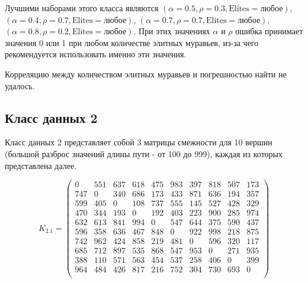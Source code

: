Лучшими наборами этого класса являются $(\alpha = 0.5, \rho = 0.3, \text{Elites} = \text{любое})$, $(\alpha = 0.4, \rho = 0.7, \text{Elites} = \text{любое})$, $(\alpha = 0.7, \rho = 0.7, \text{Elites} = \text{любое})$, $(\alpha = 0.8, \rho = 0.2, \text{Elites} = \text{любое})$.
При этих значениях $\alpha$ и $\rho$ ошибка принимает значения 0 или 1 при любом количестве элитных муравьев, из-за чего рекомендуется использовать именно эти значения.

Корреляцию между количеством элитных муравьев и погрешностью найти не удалось.

\subsection{Класс данных 2}\label{par:class2}

Класс данных 2 представляет собой 3 матрицы смежности для 10 вершин (большой разброс значений длины пути - от 100 до 999), каждая из которых представлена далее.

\begin{equation}
	\label{eq:kd2.1}
	K_{2.1} = \begin{pmatrix}
        0 & 551 & 637 & 618 & 475 & 983 & 397 & 818 & 507 & 173 \\
        747 & 0 & 340 & 686 & 173 & 433 & 871 & 636 & 194 & 357 \\
        599 & 405 & 0 & 108 & 737 & 555 & 145 & 527 & 428 & 329 \\
        470 & 344 & 193 & 0 & 192 & 403 & 223 & 900 & 285 & 974 \\
        632 & 613 & 841 & 994 & 0 & 547 & 644 & 375 & 590 & 437 \\
        596 & 358 & 636 & 467 & 848 & 0 & 922 & 998 & 218 & 875 \\
        742 & 962 & 424 & 858 & 219 & 481 & 0 & 596 & 320 & 117 \\
        685 & 712 & 897 & 535 & 868 & 547 & 953 & 0 & 271 & 935 \\
        388 & 110 & 571 & 563 & 454 & 537 & 258 & 406 & 0 & 399 \\
        964 & 484 & 426 & 817 & 216 & 752 & 304 & 730 & 693 & 0 \\
	\end{pmatrix}
\end{equation}

